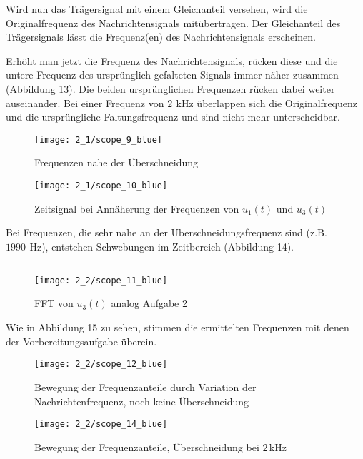 \documentclass[a4paper, 12pt]{article}
\begin{document}
Wird nun das Trägersignal mit einem Gleichanteil versehen, wird die Originalfrequenz des Nachrichtensignals mitübertragen. Der Gleichanteil des Trägersignals lässt die Frequenz(en) des Nachrichtensignals erscheinen.

Erhöht man jetzt die Frequenz des Nachrichtensignals, rücken diese und die
untere Frequenz des ursprünglich gefalteten Signals immer näher zusammen (Abbildung 13). Die beiden ursprünglichen Frequenzen rücken dabei weiter auseinander. Bei einer Frequenz von $2 \,\ \si{\kilo\hertz}$ überlappen sich die Originalfrequenz und die ursprüngliche Faltungsfrequenz und sind nicht mehr unterscheidbar.

\begin{figure}[H]
  \begin{center}
  \texttt{[image: 2\_1/scope\_9\_blue]}
  \caption{Frequenzen nahe der Überschneidung}
  \end{center}
\end{figure}

\begin{figure}[H]
  \begin{center}
  \texttt{[image: 2\_1/scope\_10\_blue]}
  \caption{Zeitsignal bei Annäherung der Frequenzen von $u_1(t)$ und $u_3(t)$}
  \end{center}
\end{figure}

Bei Frequenzen, die sehr nahe an der Überschneidungsfrequenz sind (z.B. $1990
\,\ \si{\hertz}$), entstehen Schwebungen im Zeitbereich (Abbildung 14).


\subsection{}

\begin{figure}[H]
	\texttt{[image: 2\_2/scope\_11\_blue]}
	\caption{FFT von $u_3(t)$ analog Aufgabe 2}
\end{figure}

Wie in Abbildung 15 zu sehen, stimmen die ermittelten Frequenzen mit denen der Vorbereitungsaufgabe überein. 

\begin{figure}[H]
\begin{center}
	\texttt{[image: 2\_2/scope\_12\_blue]}
	\caption{Bewegung der Frequenzanteile durch Variation der Nachrichtenfrequenz, noch keine Überschneidung}
\end{center}
\end{figure}
\begin{figure}[H]
\begin{center}
	\texttt{[image: 2\_2/scope\_14\_blue]}
	\caption{Bewegung der Frequenzanteile, Überschneidung bei $2 \, \si{\kilo\hertz}$}
\end{center}
\end{figure}
\end{document}

